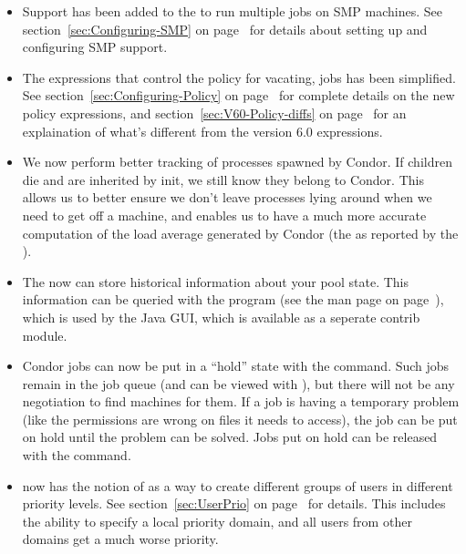 \begin{itemize}

\item Support has been added to the  to run multiple
jobs on SMP machines.
See section~\ref{sec:Configuring-SMP} on
page~\pageref{sec:Configuring-SMP} for details about setting up and
configuring SMP support.

\item The expressions that control the  policy for
vacating, jobs has been simplified.
See section~\ref{sec:Configuring-Policy} on
page~\pageref{sec:Configuring-Policy} for complete details on the new
policy expressions, and section~\ref{sec:V60-Policy-diffs} on
page~\pageref{sec:V60-Policy-diffs} for an explaination of what's
different from the version 6.0 expressions.

\item We now perform better tracking of processes spawned by Condor.
If children die and are inherited by init, we still know they belong
to Condor.
This allows us to better ensure we don't leave processes lying around
when we need to get off a machine, and enables us to have a much more
accurate computation of the load average generated by Condor (the
 as reported by the ). 

\item The  now can store historical information
about your pool state.
This information can be queried with the  program (see
the man page on page~\pageref{man-condor-stats}), which is used by the
 Java GUI, which is available as a seperate contrib
module.

\item Condor jobs can now be put in a ``hold'' state with the
 command.
Such jobs remain in the job queue (and can be viewed with ),
but there will not be any negotiation to find machines for them.
If a job is having a temporary problem (like the permissions are 
wrong on files it needs to access), the job can be put on hold until
the problem can be solved.
Jobs put on hold can be released with the  command.

\item {} now has the notion of  as a
way to create different groups of users in different priority levels.
See section~\ref{sec:UserPrio} on page~\pageref{sec:UserPrio} for
details.
This includes the ability to specify a local priority domain, and all
users from other domains get a much worse priority.


\end{itemize}
